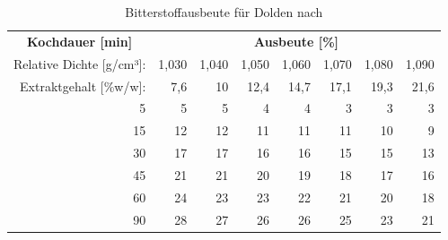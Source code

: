 \documentclass[a4paper,parskip=half]{scrartcl}
\begin{document}
\begin{table}[H]
\centering
\begin{tabular}{rrrrrrrr} 
\toprule
\multicolumn{1}{c}{\textbf{Kochdauer [min]}} & \multicolumn{7}{c}{\textbf{Ausbeute [\%]}}  \\
Relative Dichte [g/cm³]:                                        & 1,030 & 1,040 & 1,050 & 1,060 & 1,070 & 1,080  & 1,090                   \\
Extraktgehalt [\%w/w]:                                            & 7,6 & 10 & 12,4 & 14,7 & 17,1 & 19,3  & 21,6                   \\                                            
\midrule

5                                            & 5     & 5     & 4     & 4     & 3     & 3      & 3                          \\
15                                           & 12    & 12    & 11    & 11    & 11    & 10     & 9                          \\
30                                           & 17    & 17    & 16    & 16    & 15    & 15     & 13                         \\
45                                           & 21    & 21    & 20    & 19    & 18    & 17     & 16                         \\
60                                           & 24    & 23    & 23    & 22    & 21    & 20     & 18                         \\
90                                           & 28    & 27    & 26    & 26    & 25    & 23     & 21                         \\
\bottomrule
\end{tabular}
\caption{Bitterstoffausbeute für Dolden nach \citeauthor{Mosher1994} \parencite[51]{Holle2010}}
\label{table:mosherbakt}
\end{table}
\end{document}
